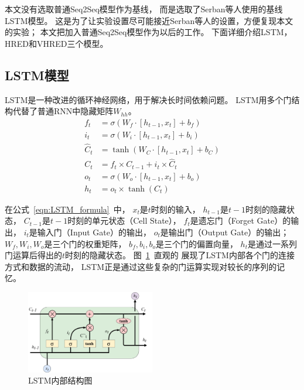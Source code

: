 本文没有选取普通Seq2Seq模型作为基线，
而是选取了Serban等人使用的基线LSTM模型。
这是为了让实验设置尽可能接近Serban等人的设置，方便复现本文的实验；
本文把加入普通Seq2Seq模型作为以后的工作。
下面详细介绍LSTM，HRED和VHRED三个模型。

\subsection{LSTM模型}\label{subsec:LSTM}
LSTM是一种改进的循环神经网络，用于解决长时间依赖问题。
LSTM用多个门结构代替了普通RNN中隐藏矩阵$W_{hh}$。
\begin{align}
    f_t &= \sigma(W_f \cdot [h_{t-1}, x_t] + b_f) \\
    i_t &= \sigma(W_i \cdot [h_{t-1}, x_t] + b_i) \\
    \hat{C}_t &= \tanh(W_C \cdot [h_{t-1}, x_t] + b_C) \\
    C_t &= f_t \times C_{t-1} + i_t \times \hat{C}_t \\
    o_t &= \sigma(W_o \cdot [h_{t-1}, x_t] + b_o) \\
    h_t &= o_t \times \tanh(C_t)
    \label{eqn:LSTM_formula}
\end{align}

在公式~\ref{eqn:LSTM_formula}~中，
$x_t$是$t$时刻的输入，
$h_{t-1}$是$t-1$时刻的隐藏状态，
$C_{t-1}$是$t-1$时刻的单元状态（Cell State），
$f_t$是遗忘门（Forget Gate）的输出，
$i_t$是输入门（Input Gate）的输出，
$o_t$是输出门（Output Gate）的输出；
$W_f, W_i, W_o$是三个门的权重矩阵，
$b_f, b_i, b_o$是三个门的偏置向量，
$h_t$是通过一系列门运算后得出的$t$时刻的隐藏状态。
图~\ref{fig:LSTM_structure}~直观的
展现了LSTM内部各个门的连接方式和数据的流动，
LSTM正是通过这些复杂的门运算实现对较长的序列的记忆。
\begin{figure}[H]
    \includegraphics[width=0.5\textwidth]{figure/drawio/LSTM_v9.pdf}
    \centering
    \caption{LSTM内部结构图}
    \label{fig:LSTM_structure}
\end{figure}


